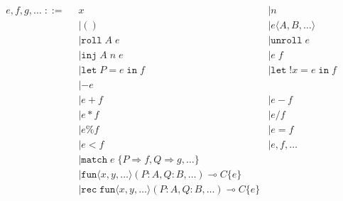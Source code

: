 \documentclass{scrartcl}
\begin{document}
\begin{minipage}[t]{20cm}
  \[\begin{array}{cll}
      e, f, g, \dots \; ::= \;\; & x                                                                                                  & | n                                    \\
                                 & | ()                                                                                               & | e \langle A, B, \dots \rangle        \\
                                 & | \mathtt{roll}\;A\;e                                                                              & | \mathtt{unroll}\;e                   \\
                                 & | \mathtt{inj}\;A\;n\;e                                                                            & | e\;f                                 \\
                                 & | \mathtt{let}\;P = e\;\mathtt{in}\;f                                                              & | \mathtt{let}\;!x = e\;\mathtt{in}\;f \\
                                 & | -e                                                                                                                                        \\
                                 & | e + f                                                                                            & | e - f                                \\
                                 & | e * f                                                                                            & | e / f                                \\
                                 & | e \% f                                                                                           & | e = f                                \\
                                 & | e < f                                                                                            & | e, f, \dots                          \\
                                 & | \mathtt{match}\;e\;\{ P \Rightarrow f, Q \Rightarrow g, \dots \}                                                                          \\
                                 & | \mathtt{fun} \langle x, y, \dots \rangle (P : A, Q : B, \dots) \multimap C \{ e \}                                                        \\
                                 & | \mathtt{rec}\;\mathtt{fun} \langle x, y, \dots \rangle (P : A, Q : B, \dots) \multimap C \{ e \}                                          \\
    \end{array}\]
\end{minipage}
\end{document}
